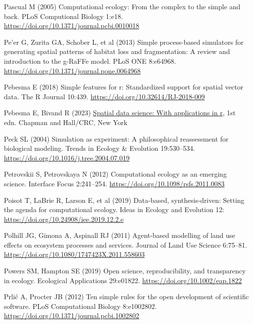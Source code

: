 \documentclass[
  10pt,
  a4paperpaper,
]{article}
\newlength{\cslhangindent}
\newenvironment{CSLReferences}[2] %
 {\begin{list}{}{%
  \setlength{\itemindent}{0pt}
  \setlength{\leftmargin}{0pt}
  \setlength{\parsep}{0pt}
  \ifodd #1
   \setlength{\leftmargin}{\cslhangindent}
   \setlength{\itemindent}{-1\cslhangindent}
  \fi
  \setlength{\itemsep}{#2\baselineskip}}}
 {\end{list}}
\begin{document}
\begin{CSLReferences}{1}{1}
Pascual M (2005) Computational ecology: From the complex to the simple
and back. PLoS Computional Biology 1:e18.
\url{https://doi.org/10.1371/journal.pcbi.0010018}

Pe'er G, Zurita GA, Schober L, et al (2013) Simple process-based
simulators for generating spatial patterns of habitat loss and
fragmentation: A review and introduction to the g-RaFFe model. PLoS ONE
8:e64968. \url{https://doi.org/10.1371/journal.pone.0064968}

Pebesma E (2018) Simple features for r: Standardized support for spatial
vector data. The R Journal 10:439.
\url{https://doi.org/10.32614/RJ-2018-009}

Pebesma E, Bivand R (2023)
\href{https://doi.org/10.1201/9780429459016}{Spatial data science: With
applications in r}, 1st edn. {Chapman and Hall/CRC}, New York

Peck SL (2004) Simulation as experiment: A philosophical reassessment
for biological modeling. Trends in Ecology \& Evolution 19:530--534.
\url{https://doi.org/10.1016/j.tree.2004.07.019}

Petrovskii S, Petrovskaya N (2012) Computational ecology as an emerging
science. Interface Focus 2:241--254.
\url{https://doi.org/10.1098/rsfs.2011.0083}

Poisot T, LaBrie R, Larson E, et al (2019) Data-based, synthesis-driven:
Setting the agenda for computational ecology. Ideas in Ecology and
Evolution 12: \url{https://doi.org/10.24908/iee.2019.12.2.e}

Polhill JG, Gimona A, Aspinall RJ (2011) Agent-based modelling of land
use effects on ecosystem processes and services. Journal of Land Use
Science 6:75--81. \url{https://doi.org/10.1080/1747423X.2011.558603}

Powers SM, Hampton SE (2019) Open science, reproducibility, and
transparency in ecology. Ecological Applications 29:e01822.
\url{https://doi.org/10.1002/eap.1822}

Prlić A, Procter JB (2012) Ten simple rules for the open development of
scientific software. PLoS Computational Biology 8:e1002802.
\url{https://doi.org/10.1371/journal.pcbi.1002802}


\end{CSLReferences}
\end{document}
